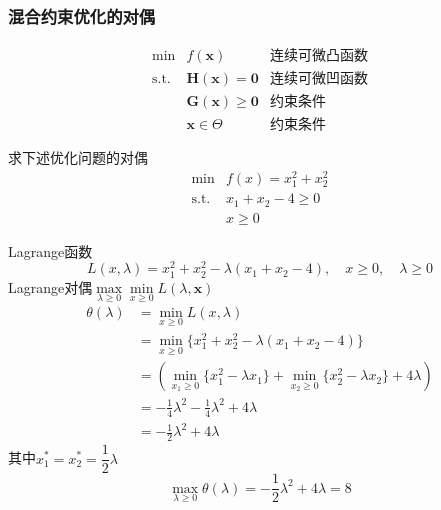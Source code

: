 \subsubsection{混合约束优化的对偶}
\[
    \begin{array}{rlr}
        \min & f(\boldsymbol{x}) & \text{连续可微凸函数}\\
        \operatorname{s.t.} & \boldsymbol{H}(\boldsymbol{x}) = \boldsymbol{0} &\text{连续可微凹函数} \\
         & \boldsymbol{G}(\boldsymbol{x}) \geqslant \boldsymbol{0} &\text{约束条件} \\
         & \boldsymbol{x}\in\Theta & \text{约束条件}
    \end{array}
\]
\begin{example}
    求下述优化问题的对偶
    \[
        \begin{array}{rl}
            \operatorname*{min}&f(x)=x_{1}^{2}+x_{2}^{2}\\
            \mathrm{s.t.} & x_{1}+x_{2}-4\geq 0\\
            &x\geq 0
        \end{array}    
    \]
    \begin{solution}
        Lagrange函数
        \[
            L(x,\lambda)=x_{1}^{2}+x_{2}^{2}-\lambda(x_{1}+x_{2}-4),\quad x\geq 0,\quad\lambda\geq 0
        \]
        Lagrange对偶$\max\limits_{\lambda\geqslant 0}\min\limits_{x\geqslant 0}L(\lambda,\boldsymbol{x})$
        \[
            \begin{aligned}
                \theta(\lambda)& =\min_{x\geq0}L(x,\lambda)  \\
                &=\min_{x\geq0}\{x_{1}^{2}+x_{2}^{2}-\lambda(x_{1}+x_{2}-4)\} \\
                &=\left(\operatorname*{min}_{x_{1}\geq0}\{x_{1}^{2}-\lambda x_{1}\}+\operatorname*{min}_{x_{2}\geq0}\{x_{2}^{2}-\lambda x_{2}\}+4\lambda\right) \\
                &=-\frac14\lambda^{2}-\frac14\lambda^{2}+4\lambda  \\
                &=-\frac{1}{2}\lambda^{2}+4\lambda 
            \end{aligned}  
        \]
        其中$x_1^* = x_2^* = \dfrac{1}{2}\lambda$
        \[
            \max_{\lambda\geq 0}\theta(\lambda)=-\frac{1}{2}\lambda^{2}+4\lambda=8
        \]
    \end{solution}    
\end{example}
